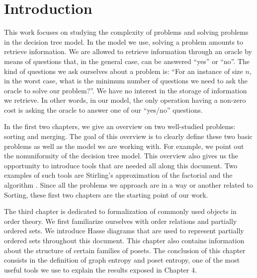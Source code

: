 \chapter*{Introduction}

This work focuses on studying the complexity of problems and solving problems
in the decision tree model. In the model we use, solving a problem
amounts to retrieve information. We are allowed to retrieve information
through an oracle by means of questions that, in the general case,
can be answered ``yes'' or ``no''. The kind of questions we ask ourselves
about a problem is: ``For an instance of size \(n\), in the worst case, what is
the minimum number of questions we need to ask the oracle to solve our
problem?''. We have no interest in the storage of information we retrieve.
In other words, in our model, the only operation having a non-zero cost is
asking the oracle to answer one of our ``yes/no'' questions.

In the first two chapters, we give an overview on two well-studied problems:
sorting and merging. The goal of this overview is to clearly define these two
basic problems as well as the model we are working with. For example, we point
out the nonuniformity of the decision tree model. This overview also gives us
the opportunity to introduce tools that are needed all along this document. Two
examples of such tools are Stirling's approximation of the factorial
\cite{feller1967direct} and the \mergesort algorithm
\cite{goldstine:1948,leiserson:2001}. Since all the problems we approach are in
a way or another related to Sorting, these first two chapters are the starting
point of our work.

The third chapter is dedicated to formalization of commonly used objects
in order theory. We first familiarize ourselves with order
relations and partially ordered sets. We introduce Hasse diagrams that
are used to represent partially ordered sets throughout this document.
This chapter also contains information about the structure of
certain families of posets. The conclusion of this
chapter consists in the definition of graph entropy \cite{korner1973coding}
and poset entropy, one of the most useful tools we use to explain the
results exposed in Chapter \(4\).

